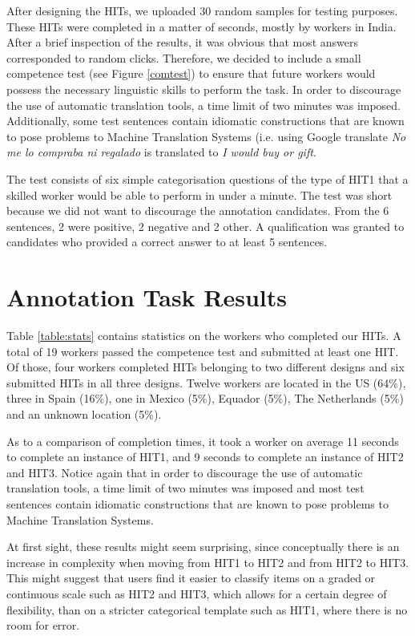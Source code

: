 \documentclass[11pt]{elsarticle}
\begin{document}
After designing the HITs, we uploaded 30 random samples for testing purposes. These HITs were completed in a matter of seconds, mostly by workers in India. After a brief inspection of the results, it was obvious that most answers corresponded to random clicks. Therefore, we decided to include a small competence test (see Figure \ref{comtest}) to ensure that future workers would possess the necessary linguistic skills to perform the task. In order to discourage the use of automatic translation tools, a time limit of two minutes was imposed. Additionally, some test sentences contain idiomatic constructions that are known to pose problems to Machine Translation Systems (i.e. using Google translate \textit{No me lo compraba ni regalado} is translated to \textit{I would buy or gift}.


The test consists of six simple categorisation questions of the type of HIT1 that a skilled worker would be able to perform in under a minute. The test was short because we did not want to discourage the annotation candidates. From the 6 sentences, 2 were positive, 2 negative and 2 other. A qualification was granted to candidates who provided a correct answer to at least 5 sentences.

\newpage

\section{Annotation Task Results}
\label{sect:results}


Table \ref{table:stats} contains statistics on the workers who completed our HITs. A total of 19 workers passed the competence test and submitted at least one HIT. Of those, four workers completed HITs belonging to two different designs and six submitted HITs in all three designs. Twelve workers are located in the US (64\%), three in Spain (16\%), one in Mexico (5\%), Equador (5\%), The Netherlands (5\%) and an unknown location (5\%).

As to a comparison of completion times, it took a worker on average 11 seconds to complete an instance of HIT1, and 9 seconds to complete an instance of HIT2 and HIT3. Notice again that in order to discourage the use of automatic translation tools, a time limit of two minutes was imposed and most test sentences contain idiomatic constructions that are known to pose problems to Machine Translation Systems.

At first sight, these results might seem surprising, since conceptually there is an increase in complexity when moving from HIT1 to HIT2 and from HIT2 to HIT3. This might suggest that users find it easier to classify items on a graded or continuous scale such as HIT2 and HIT3, which allows for a certain degree of flexibility, than on a stricter categorical template such as HIT1, where there is no room for error.
\end{document}
